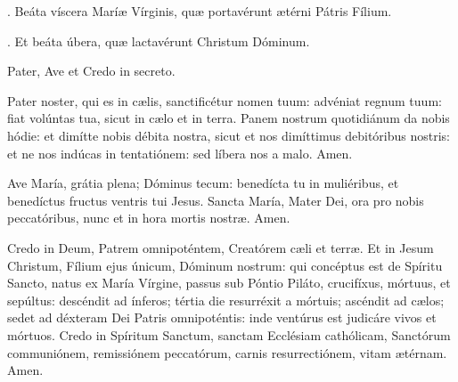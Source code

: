 \documentclass[12pt,a5paper,openany]{memoir}
\begin{document}
\switchcolumn*


\Vbar. Beáta víscera Maríæ Vírginis, quæ portavérunt ætérni Pátris Fílium.

\Rbar. Et beáta úbera, quæ lactavérunt Christum Dóminum.

\switchcolumn



\switchcolumn*
{}

Pater, Ave et Credo in secreto.

\switchcolumn


\switchcolumn*

Pater noster, qui es in cælis, sanctificétur nomen tuum: advéniat regnum tuum: fiat volúntas tua, sicut in cælo et in terra. Panem nostrum quotidiánum da nobis hódie: et dimítte nobis débita nostra, sicut et nos dimíttimus debitóribus nostris: et ne nos indúcas in tentatiónem: sed líbera nos a malo. Amen.

\switchcolumn


\switchcolumn*

Ave María, grátia plena; Dóminus tecum: benedícta tu in muliéribus, et benedíctus fructus ventris tui Jesus. Sancta María, Mater Dei, ora pro nobis peccatóribus, nunc et in hora mortis nostræ. Amen.


\switchcolumn


\switchcolumn*

Credo in Deum, Patrem omnipoténtem, Creatórem cæli et terræ. Et in Jesum Christum, Fílium ejus únicum, Dóminum nostrum: qui concéptus est de Spíritu Sancto, natus ex María Vírgine, passus sub Póntio Piláto, crucifíxus, mórtuus, et sepúltus: descéndit ad ínferos; tértia die resurréxit a mórtuis; ascéndit ad cælos; sedet ad déxteram Dei Patris omnipoténtis: inde ventúrus est judicáre vivos et mórtuos. Credo in Spíritum Sanctum, sanctam Ecclésiam cathólicam, Sanctórum communiónem, remissiónem peccatórum, carnis resurrectiónem, vitam ætérnam. Amen.
\switchcolumn
\end{document}
